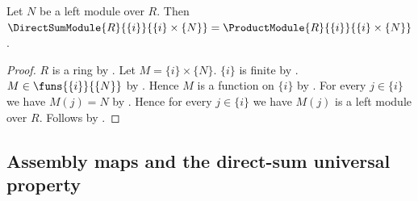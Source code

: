 \begin{proposition}\label{singleton_direct_sum_module_eq_product_module}
    Let $N$ be a left module over $R$.
    Then $\DirectSumModule{R}{\{i\}}{\{i\}\times\{N\}}
        =\ProductModule{R}{\{i\}}{\{i\}\times\{N\}}$.
\end{proposition}
\begin{proof}
    $R$ is a ring by .
    Let $M=\{i\}\times\{N\}$.
    $\{i\}$ is finite by .
    $M\in\funs{\{i\}}{\{N\}}$ by .
    Hence $M$ is a function on $\{i\}$ by
        .
    For every $j\in\{i\}$ we have $M(j)=N$ by
        .
    Hence for every $j\in\{i\}$ we have
        $M(j)$ is a left module over $R$.
    Follows by .
\end{proof}

\subsection{Assembly maps and the direct-sum universal property}

